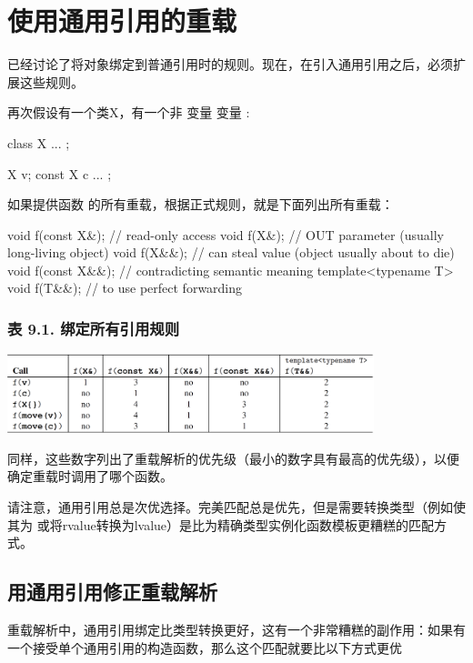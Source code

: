 \section{使用通用引用的重载}
已经讨论了将对象绑定到普通引用时的规则。现在，在引入通用引用之后，必须扩展这些规则。

再次假设有一个类X，有一个非  变量  变量 :

\begin{cppcode}
class X {
	...
};

X v;
const X c{ ... };
\end{cppcode}

如果提供函数  的所有重载，根据正式规则，就是下面列出所有重载：

\begin{cppcode}
void f(const X&); // read-only access
void f(X&); // OUT parameter (usually long-living object)
void f(X&&); // can steal value (object usually about to die)
void f(const X&&); // contradicting semantic meaning
template<typename T>
void f(T&&); // to use perfect forwarding
\end{cppcode}

\subsubsection{表 9.1. 绑定所有引用规则}
\begin{center}
	\includegraphics[width=0.8\textwidth]{part2/ch9/images/1}
\end{center}

同样，这些数字列出了重载解析的优先级（最小的数字具有最高的优先级），以便确定重载时调用了哪个函数。

请注意，通用引用总是次优选择。完美匹配总是优先，但是需要转换类型（例如使其为  或将rvalue转换为lvalue）是比为精确类型实例化函数模板更糟糕的匹配方式。

\subsection{用通用引用修正重载解析}

重载解析中，通用引用绑定比类型转换更好，这有一个非常糟糕的副作用：如果有一个接受单个通用引用的构造函数，那么这个匹配就要比以下方式更优

